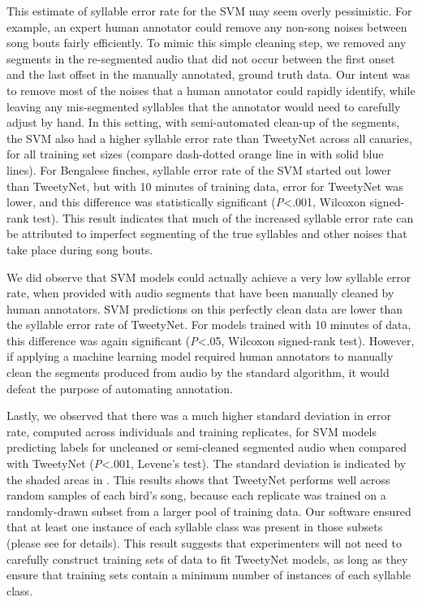 \documentclass[9pt,lineno]{elife}
\begin{document}
This estimate of syllable error rate for the SVM may seem overly pessimistic. 
For example, an expert human annotator could remove 
any non-song noises between song bouts fairly efficiently. 
To mimic this simple cleaning step, 
we removed any segments in the re-segmented audio that did not occur 
between the first onset and the last offset in the manually annotated, 
ground truth data. Our intent was to remove most of the noises 
that a human annotator could rapidly identify, while leaving any mis-segmented syllables  
that the annotator would need to carefully adjust by hand. 
In this setting, with semi-automated clean-up of the segments, 
the SVM also had a higher syllable error rate than TweetyNet across all canaries, 
for all training set sizes
(compare dash-dotted orange line in  with solid blue lines). 
For Bengalese finches, syllable error rate of the SVM started out lower than TweetyNet, 
but with 10 minutes of training data, error for TweetyNet was lower, 
and this difference was statistically significant (\textit{P}<.001, Wilcoxon signed-rank test).
This result indicates that much of the increased syllable error rate 
can be attributed to imperfect segmenting of the true syllables 
and other noises that take place during song bouts.

We did observe that SVM models could actually achieve a very low syllable error rate, 
when provided with audio segments that have been manually cleaned by human annotators. 
SVM predictions on this perfectly clean data are lower than the syllable error rate of TweetyNet.
For models trained with 10 minutes of data, 
this difference was again significant (\textit{P}<.05, Wilcoxon signed-rank test). 
However, if applying a machine learning model required human annotators 
to manually clean the segments produced from audio by the standard algorithm, 
it would defeat the purpose of automating annotation.

Lastly, we observed that there was a much higher standard deviation  
in error rate, computed across individuals and training replicates, 
for SVM models predicting labels for uncleaned or semi-cleaned segmented audio 
when compared with TweetyNet (\textit{P}<.001, Levene's test). 
The standard deviation is indicated by the shaded areas in . 
This results shows that TweetyNet performs well 
across random samples of each bird's song, 
because each replicate was trained on a randomly-drawn subset from a larger pool of training data. 
Our software ensured that at least one instance of each syllable class was present in those subsets 
(please see  for details). 
This result suggests that experimenters 
will not need to carefully construct training sets of data to fit TweetyNet models, 
as long as they ensure that training sets contain a minimum number of instances of each syllable class.
\end{document}
